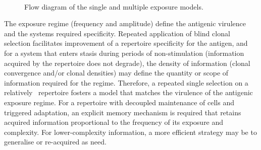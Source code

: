 \begin{figure}[htp]
{\begin{minipage}[t]{0.50\textwidth}
	\end{minipage}}\\
	\caption{Flow diagram of the single and multiple exposure models.}
	\label{fig:cells:exposures:flowdiagram} %
\end{figure}

The exposure regime (frequency and amplitude) define the antigenic virulence and the systems required specificity. Repeated application of blind clonal selection facilitates improvement of a repertoire specificity for the antigen, and for a system that enters stasis during periods of non-stimulation (information acquired by the repertoire does not degrade), the density of information (clonal convergence and/or clonal densities) may define the quantity or scope of information required for the regime. Therefore, a repeated single selection on a relatively \naive\ repertoire fosters a model that matches the virulence of the antigenic exposure regime. For a repertoire with decoupled maintenance of cells and triggered adaptation, an explicit memory mechanism is required that retains acquired information proportional to the frequency of its exposure and complexity. For lower-complexity information, a more efficient strategy may be to generalise or re-acquired as need. 


%
%
